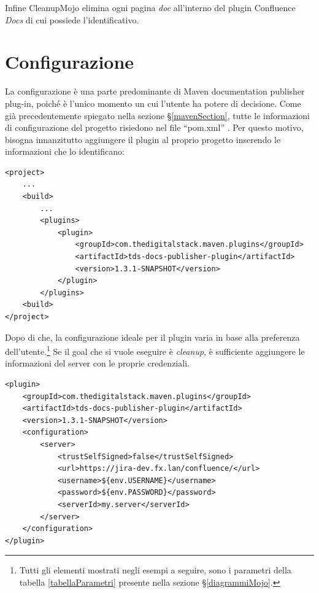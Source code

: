 Infine CleanupMojo elimina ogni pagina \emph{doc} all'interno del plugin Confluence \emph{Docs} di cui possiede l'identificativo.



\section{Configurazione} \label{configurazioneSec}
La configurazione è una parte predominante di Maven documentation publisher plug-in, poiché è l'unico momento un cui l'utente ha potere di decisione.
Come già precedentemente spiegato nella sezione \S\ref{mavenSection}, tutte le informazioni di configurazione del progetto risiedono nel file ``pom.xml'' \cite{site:maven-plugin-configurazione}.
Per questo motivo, bisogna innanzitutto aggiungere il plugin al proprio progetto inserendo le informazioni che lo identificano:

\begin{lstlisting} 
<project>
    ...
    <build>
        ...
        <plugins>
            <plugin>
                <groupId>com.thedigitalstack.maven.plugins</groupId>
                <artifactId>tds-docs-publisher-plugin</artifactId>
                <version>1.3.1-SNAPSHOT</version>
            </plugin>
        </plugins>
    <build>
</project>
\end{lstlisting}

Dopo di che, la configurazione ideale per il plugin varia in base alla preferenza dell'utente.\footnote{Tutti gli elementi mostrati negli esempi a seguire, sono i parametri della tabella \ref{tabellaParametri} presente nella sezione \S\ref{diagrammiMojo}.}
Se il goal che si vuole eseguire è \emph{cleanup}, è sufficiente aggiungere le informazioni del server con le proprie credenziali.

\begin{lstlisting}
<plugin>
    <groupId>com.thedigitalstack.maven.plugins</groupId>
    <artifactId>tds-docs-publisher-plugin</artifactId>
    <version>1.3.1-SNAPSHOT</version>
    <configuration>
        <server>
            <trustSelfSigned>false</trustSelfSigned>
            <url>https://jira-dev.fx.lan/confluence/</url>
            <username>${env.USERNAME}</username>
            <password>${env.PASSWORD}</password>
            <serverId>my.server</serverId>
        </server>
    </configuration>
</plugin>
\end{lstlisting}

